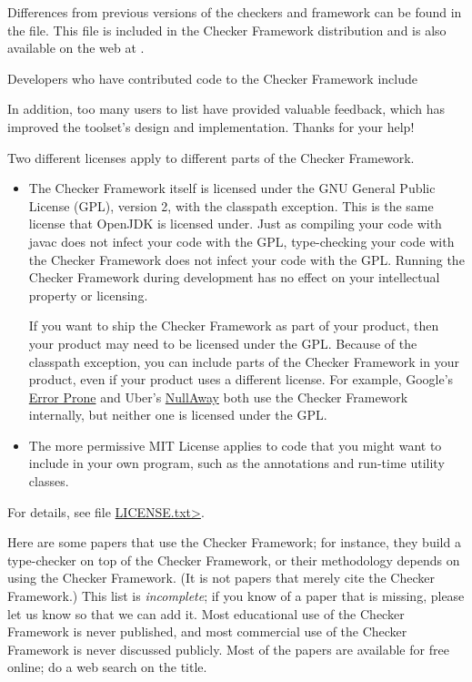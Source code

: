 
Differences from previous versions of the checkers and framework can be found
in the  file.  This file is included in the
Checker Framework distribution and is also available on the web at
.

Developers who have contributed code to the Checker Framework include


In addition, too many users to list have provided valuable feedback, which
has improved the toolset's design and implementation.
Thanks for your help!



Two different licenses apply to different parts of the Checker Framework.
\begin{itemize}
\item
The Checker Framework itself is licensed under the GNU General Public License
(GPL), version 2, with the classpath exception.
This is the same license that OpenJDK is licensed
under.  Just as compiling your code with javac does not infect your code
with the GPL, type-checking your code with the Checker Framework does not
infect your code with the GPL\@.  Running the Checker Framework during
development has no effect on your intellectual property or licensing.

If you want to ship the Checker Framework as part of your product, then
your product may need to be licensed under the GPL\@.  Because of the
classpath exception, you can include parts of the Checker Framework in your
product, even if your product uses a different license.  For example,
Google's \href{https://github.com/google/error-prone}{Error Prone} and
Uber's \href{https://github.com/uber/NullAway}{NullAway} both use the
Checker Framework internally, but neither one is licensed under the GPL\@.

\item
The more permissive MIT License applies
to code that you might want to include in your own
program, such as the annotations and run-time utility classes.
\end{itemize}

\noindent
For details, see file
\href{https://raw.githubusercontent.com/typetools/checker-framework/master/LICENSE.txt}{\<LICENSE.txt>}.



Here are some papers that use the Checker Framework;
for instance, they build a type-checker on top of the Checker Framework, or
their methodology depends on using the Checker Framework.
(It is not papers that merely cite the Checker Framework.)
This list is \emph{incomplete}; if you know of a paper that
is missing, please let us know so that we can add it.
Most educational use of the Checker Framework is never published, and most
commercial use of the Checker Framework is never discussed publicly.
Most of the papers are available for free online; do a web search on the
title.

